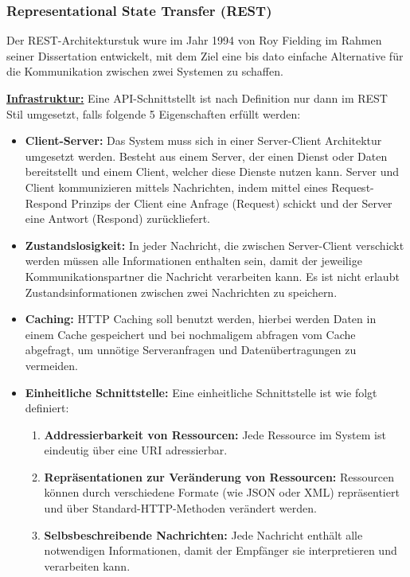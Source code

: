 \subsubsection{Representational State Transfer (REST)}

Der REST-Architekturstuk wure im Jahr 1994 von Roy Fielding im Rahmen seiner Dissertation entwickelt, mit dem Ziel eine bis dato einfache Alternative für die Kommunikation zwischen zwei Systemen zu schaffen. 

\textbf{\underline{Infrastruktur:}}
Eine API-Schnittstellt ist nach Definition nur dann im REST Stil umgesetzt, falls folgende 5 Eigenschaften erfüllt werden:


\begin{itemize}
	\item \textbf{Client-Server:}
	Das System muss sich in einer Server-Client Architektur umgesetzt werden. Besteht aus einem Server, der einen Dienst oder Daten bereitstellt und einem Client, welcher diese Dienste nutzen kann. Server und Client kommunizieren mittels Nachrichten, indem mittel eines Request-Respond Prinzips der Client eine Anfrage (Request) schickt und der Server eine Antwort (Respond)
	zurückliefert.
	
	\item \textbf{Zustandslosigkeit:} 
	In jeder Nachricht, die zwischen Server-Client verschickt werden müssen alle Informationen enthalten sein, damit der jeweilige Kommunikationspartner die Nachricht verarbeiten kann. Es ist nicht erlaubt Zustandsinformationen zwischen zwei Nachrichten zu speichern.
	\item \textbf{Caching:}
	HTTP Caching soll benutzt werden, hierbei werden Daten in einem Cache gespeichert und bei nochmaligem abfragen vom Cache abgefragt, um unnötige Serveranfragen und Datenübertragungen zu vermeiden.
	\item \textbf{Einheitliche Schnittstelle:}
	Eine einheitliche Schnittstelle ist wie folgt definiert:
	
	\begin{enumerate}
		\item \textbf{Addressierbarkeit von Ressourcen:}
		Jede Ressource im System ist eindeutig über eine URI adressierbar.
		\item \textbf{Repräsentationen zur Veränderung von Ressourcen:}
		Ressourcen können durch verschiedene Formate (wie JSON oder XML) repräsentiert und über Standard-HTTP-Methoden verändert werden.
		
		\item \textbf{Selbsbeschreibende Nachrichten:}
		Jede Nachricht enthält alle notwendigen Informationen, damit der Empfänger sie interpretieren und verarbeiten kann.
		

\end{enumerate}
\end{itemize}
